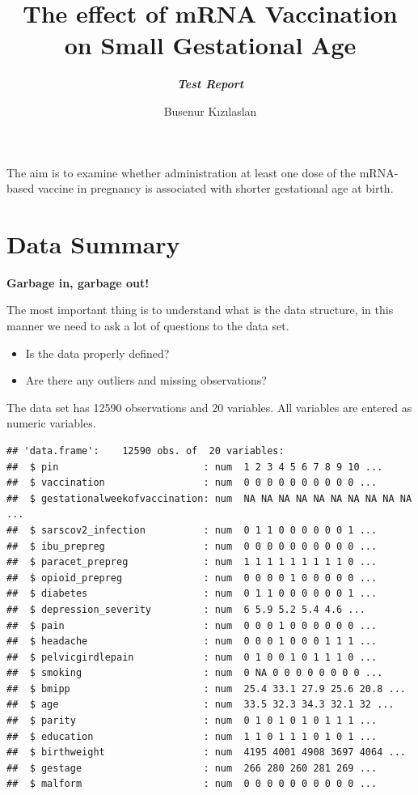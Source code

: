 \documentclass[
]{article}
\title{\textbf{The effect of mRNA Vaccination on Small Gestational Age}}
\subtitle{\textbf{\emph{Test Report}}}
\author{Busenur Kızılaslan}
\date{}
\newenvironment{Shaded}{\begin{snugshade}}{\end{snugshade}}
\newcommand{\NormalTok}[1]{#1}
\begin{document}
\maketitle

{
\setcounter{tocdepth}{2}
\tableofcontents
}
\begin{Shaded}
\begin{Highlighting}[]
\NormalTok{The aim is to examine whether administration at least one dose of the mRNA-based vaccine in pregnancy is associated with shorter gestational age at birth. }
\end{Highlighting}
\end{Shaded}

\hypertarget{data-summary}{%
\section{Data Summary}\label{data-summary}}

\textbf{Garbage in, garbage out!}

The most important thing is to understand what is the data structure, in
this manner we need to ask a lot of questions to the data set.

\begin{itemize}
\item
  Is the data properly defined?
\item
  Are there any outliers and missing observations?
\end{itemize}

The data set has 12590 observations and 20 variables. All variables are
entered as numeric variables.

\begin{verbatim}
## 'data.frame':    12590 obs. of  20 variables:
##  $ pin                         : num  1 2 3 4 5 6 7 8 9 10 ...
##  $ vaccination                 : num  0 0 0 0 0 0 0 0 0 0 ...
##  $ gestationalweekofvaccination: num  NA NA NA NA NA NA NA NA NA NA ...
##  $ sarscov2_infection          : num  0 1 1 0 0 0 0 0 0 1 ...
##  $ ibu_prepreg                 : num  0 0 0 0 0 0 0 0 0 0 ...
##  $ paracet_prepreg             : num  1 1 1 1 1 1 1 1 1 0 ...
##  $ opioid_prepreg              : num  0 0 0 0 1 0 0 0 0 0 ...
##  $ diabetes                    : num  0 1 1 0 0 0 0 0 0 1 ...
##  $ depression_severity         : num  6 5.9 5.2 5.4 4.6 ...
##  $ pain                        : num  0 0 0 1 0 0 0 0 0 0 ...
##  $ headache                    : num  0 0 0 1 0 0 0 1 1 1 ...
##  $ pelvicgirdlepain            : num  0 1 0 0 1 0 1 1 1 0 ...
##  $ smoking                     : num  0 NA 0 0 0 0 0 0 0 0 ...
##  $ bmipp                       : num  25.4 33.1 27.9 25.6 20.8 ...
##  $ age                         : num  33.5 32.3 34.3 32.1 32 ...
##  $ parity                      : num  0 1 0 1 0 1 0 1 1 1 ...
##  $ education                   : num  1 1 0 1 1 1 0 1 0 1 ...
##  $ birthweight                 : num  4195 4001 4908 3697 4064 ...
##  $ gestage                     : num  266 280 260 281 269 ...
##  $ malform                     : num  0 0 0 0 0 0 0 0 0 0 ...
\end{verbatim}
\end{document}
